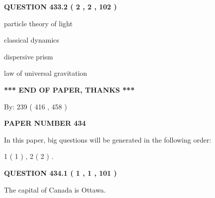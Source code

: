 \documentclass[12pt]{article}
\begin{document}
 
 
 
  
\vspace{0.2in}
  
{\textbf{\Large{QUESTION
433.2 
 ( 2 , 2 , 102 )
}}}
  
  
 
 
\noindent{}
 
 
particle theory of light
 
 
classical dynamics
 
 
dispersive prism
 
 
law of universal gravitation
 
 
 
 
   
   
\vspace{1.0in} 
{\textbf{\large{ *** END OF PAPER, THANKS *** }}} 
   
   
\hspace{1.0in} By: 
 239 ( 416 ,  458 )
   
   
   
   
\newpage 
\setcounter{page}{ 
   434001 } 
   
   
   
   
 {\textbf{ \Large{ PAPER NUMBER  434  }}}
   
   
\vspace{0.2in}
   
   
   
   
   
\vspace{0.2in}
   
In this paper, big questions will be generated in the following order: 
   
   
   1 ( 1 )
 ,
   2 ( 2 )
 .
  
\vspace{0.2in}
  
{\textbf{\Large{QUESTION
434.1 
 ( 1 , 1 , 101 )
}}}
  
  
 
 
\noindent{}
 
 
The capital of Canada is Ottawa.
 
\end{document}

